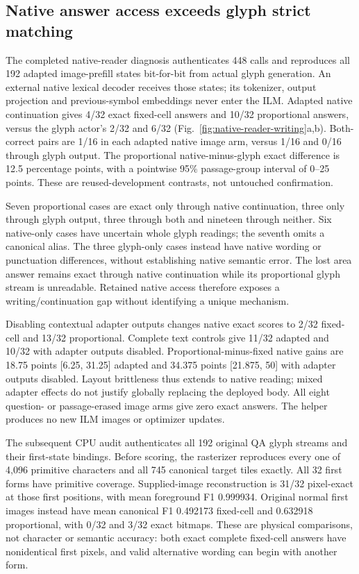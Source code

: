 \subsection*{Native answer access exceeds glyph strict matching}
The completed native-reader diagnosis authenticates 448 calls and reproduces
all 192 adapted image-prefill states bit-for-bit from actual glyph generation.
An external native lexical decoder receives those states; its tokenizer,
output projection and previous-symbol embeddings never enter the ILM.
Adapted native continuation gives 4/32 exact fixed-cell answers and 10/32
proportional answers, versus the glyph actor's 2/32 and 6/32
(Fig.~\ref{fig:native-reader-writing}a,b). Both-correct pairs are 1/16 in
each adapted native image arm, versus 1/16 and 0/16 through glyph output.
The proportional native-minus-glyph exact difference is 12.5 percentage
points, with a pointwise 95\% passage-group interval of 0--25 points.
These are reused-development contrasts, not untouched confirmation.

Seven proportional cases are exact only through native continuation, three
only through glyph output, three through both and nineteen through neither.
Six native-only cases have uncertain whole glyph readings; the seventh omits
a canonical alias. The three glyph-only cases instead have native wording or
punctuation differences, without establishing native semantic error. The lost
area answer remains exact through native continuation while its proportional
glyph stream is unreadable. Retained native access therefore exposes a
writing/continuation gap without identifying a unique mechanism.

Disabling contextual adapter outputs changes native exact scores to 2/32
fixed-cell and 13/32 proportional. Complete text controls give 11/32 adapted
and 10/32 with adapter outputs disabled. Proportional-minus-fixed native gains
are 18.75 points [6.25, 31.25] adapted and 34.375 points [21.875, 50] with
adapter outputs disabled. Layout brittleness thus extends to native reading;
mixed adapter effects do not justify globally replacing the deployed body.
All eight question- or passage-erased image arms give zero exact answers.
The helper produces no new ILM images or optimizer updates.

The subsequent CPU audit authenticates all 192 original QA glyph streams and
their first-state bindings. Before scoring, the rasterizer reproduces every
one of 4,096 primitive characters and all 745 canonical target tiles exactly.
All 32 first forms have primitive coverage. Supplied-image reconstruction is
31/32 pixel-exact at those first positions, with mean foreground F1 0.999934.
Original normal first images instead have mean canonical F1 0.492173 fixed-cell
and 0.632918 proportional, with 0/32 and 3/32 exact bitmaps. These are physical
comparisons, not character or semantic accuracy: both exact complete fixed-cell
answers have nonidentical first pixels, and valid alternative wording can
begin with another form.

